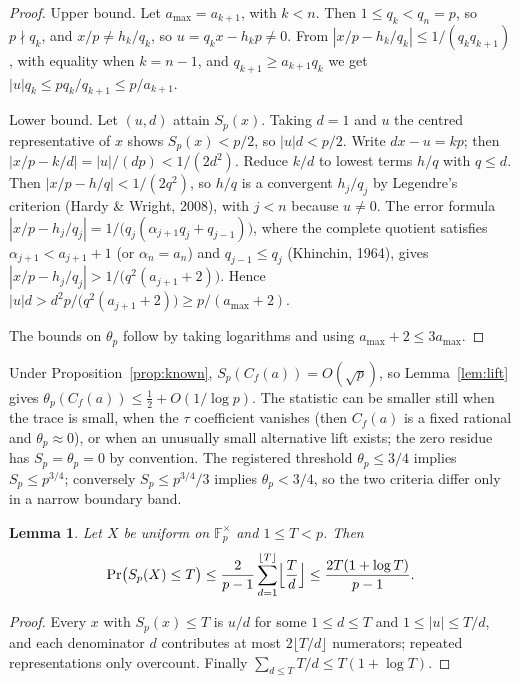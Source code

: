 \documentclass[11pt,a4paper]{article}
\numberwithin{equation}{section}
\theoremstyle{plain}
\newtheorem{lemma}[theorem]{Lemma}
\theoremstyle{definition}
\newcommand{\F}{\mathbb{F}}
\begin{document}
\begin{proof}
Upper bound. Let $a_{\max}=a_{k+1}$, with $k<n$. Then $1\le q_k<q_n=p$, so $p\nmid q_k$, and $x/p\neq h_k/q_k$, so $u=q_kx-h_kp\neq0$. From $|x/p-h_k/q_k|\le1/(q_kq_{k+1})$, with equality when $k=n-1$, and $q_{k+1}\ge a_{k+1}q_k$ we get $|u|q_k\le pq_k/q_{k+1}\le p/a_{k+1}$.

Lower bound. Let $(u,d)$ attain $S_p(x)$. Taking $d=1$ and $u$ the centred representative of $x$ shows $S_p(x)<p/2$, so $|u|d<p/2$. Write $dx-u=kp$; then $|x/p-k/d|=|u|/(dp)<1/(2d^2)$. Reduce $k/d$ to lowest terms $h/q$ with $q\le d$. Then $|x/p-h/q|<1/(2q^2)$, so $h/q$ is a convergent $h_j/q_j$ by Legendre's criterion (Hardy \& Wright, 2008), with $j<n$ because $u\neq0$. The error formula $|x/p-h_j/q_j|=1/\bigl(q_j(\alpha_{j+1}q_j+q_{j-1})\bigr)$, where the complete quotient satisfies $\alpha_{j+1}<a_{j+1}+1$ (or $\alpha_n=a_n$) and $q_{j-1}\le q_j$ (Khinchin, 1964), gives $|x/p-h_j/q_j|>1/\bigl(q^2(a_{j+1}+2)\bigr)$. Hence $|u|d>d^2p/\bigl(q^2(a_{j+1}+2)\bigr)\ge p/(a_{\max}+2)$.

The bounds on $\theta_p$ follow by taking logarithms and using $a_{\max}+2\le3a_{\max}$.
\end{proof}

Under Proposition~\ref{prop:known}, $S_p(C_f(a))=O(\sqrt p)$, so Lemma~\ref{lem:lift} gives $\theta_p(C_f(a))\le\tfrac12+O(1/\log p)$. The statistic can be smaller still when the trace is small, when the $\tau$ coefficient vanishes (then $C_f(a)$ is a fixed rational and $\theta_p\approx0$), or when an unusually small alternative lift exists; the zero residue has $S_p=\theta_p=0$ by convention. The registered threshold $\theta_p\le3/4$ implies $S_p\le p^{3/4}$; conversely $S_p\le p^{3/4}/3$ implies $\theta_p<3/4$, so the two criteria differ only in a narrow boundary band.

\begin{lemma}\label{lem:count}
Let $X$ be uniform on $\F_p^\times$ and $1\le T<p$. Then
\begin{equation}\label{eq:count}
\Pr\bigl(S_p(X)\le T\bigr)\le\frac{2}{p-1}\sum_{d=1}^{\lfloor T\rfloor}\Bigl\lfloor\frac Td\Bigr\rfloor\le\frac{2T(1+\log T)}{p-1}.
\end{equation}
\end{lemma}

\begin{proof}
Every $x$ with $S_p(x)\le T$ is $u/d$ for some $1\le d\le T$ and $1\le|u|\le T/d$, and each denominator $d$ contributes at most $2\lfloor T/d\rfloor$ numerators; repeated representations only overcount. Finally $\sum_{d\le T}T/d\le T(1+\log T)$.
\end{proof}
\end{document}
